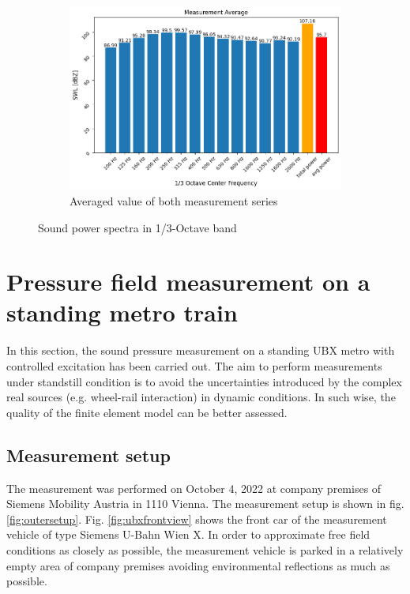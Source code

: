 \begin{figure}[H]\ContinuedFloat
     \centering
     \begin{subfigure}[b]{0.9\textwidth}
         \centering
         \includegraphics[width=\linewidth]{fig/SWL_average.png}
         \caption{Averaged value of both measurement series}
         \label{fig:average_SWL}
     \end{subfigure}
     
        \caption{Sound power spectra in 1/3-Octave band}
        \label{fig:SWL}
\end{figure}


\section{Pressure field measurement on a standing metro train}
\label{sec:pressure_field_measurement}

In this section, the sound pressure measurement on a standing UBX metro with controlled excitation has been carried out. The aim to perform measurements under standstill condition is to avoid the uncertainties introduced by the complex real sources (e.g. wheel-rail interaction) in dynamic conditions. In such wise, the quality of the finite element model can be better assessed.

\subsection*{Measurement setup}

The measurement was performed on October 4, 2022 at company premises of Siemens Mobility Austria in 1110 Vienna. The measurement setup is shown in fig. \ref{fig:outersetup}. Fig. \ref{fig:ubxfrontview} shows the front car of the measurement vehicle of type Siemens U-Bahn Wien X. In order to approximate free field conditions as closely as possible, the measurement vehicle is parked in a relatively empty area of company premises avoiding environmental reflections as much as possible.

